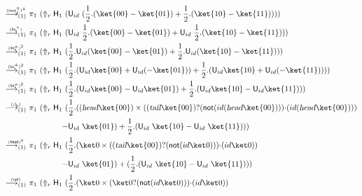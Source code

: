 \documentclass[preprint]{elsarticle}
\newcommand\lra[1][1]{\longrightarrow_{\left(#1\right)}}
\newcommand\ite[3]{{#1}?{#2}\mathord{\cdot}{#3}}
\newcommand\pair[2]{({#1}+{#2})}
\newcommand\npair[2]{({#1}-{#2})}
\newcommand\s[1]{\ensuremath{\mathsf{#1}}}
\newcommand\head{\text{\sl head}}
\newcommand\tail{\text{\sl tail}}
\newcommand\red[2][1]{\overset{\scriptscriptstyle\smash{#2}\vphantom{x}}{\lra[#1]}\ }
\newcommand\rbetab{(\s{\beta_b})}
\newcommand\rlinr{(\s{lin^+_r})}
\newcommand\rlinscalr{(\s{lin^\alpha_r})}
\newcommand\rcaneutl{(\s{neut^\Uparrow_\ell})}
\newcommand\rhead{(\s{head})}
\newcommand\rtail{(\s{tail})}
\begin{document}
\begin{align*}
  \red{\rcaneutl^4}&
                     \pi_1\ (\Uparrow_r \s H_1\ (\s U_{id}\
                     \pair { \frac 12.  \npair{\ket{00}}{\ket{01}} }
                     { \frac 12.  \npair{\ket{10}}{\ket{11}} })) \\
  \red{\rlinr}&
                \pi_1\ (\Uparrow_r \s H_1\
                \pair{\s U_{id}\ \frac 12.\npair{\ket{00}}{\ket{01}}}{\s U_{id}\ \frac 12.\npair{\ket{10}}{\ket{11}}}) \\
  \red{\rlinscalr^2}&
                      \pi_1\ (\Uparrow_r \s H_1\
                      \pair{\frac 12.\s U_{id}\npair{\ket{00}}{\ket{01}}}{\frac 12.\s U_{id}\npair{\ket{10}}{\ket{11}}}) \\
  \red{\rlinr^2}&
                  \pi_1\ (\Uparrow_r \s H_1\
                  \pair{\frac 12.\pair{\s U_{id}\ket{00}}{\s U_{id}(-\ket{01})}}{\frac 12.\pair{\s U_{id}\ket{10}}{\s U_{id}(-\ket{11})}}) \\
  \red{\rlinscalr^2}&
                      \pi_1\ (\Uparrow_r \s H_1\
                      \pair{\frac 12.\npair{\s U_{id}\ket{00}}{\s U_{id}\ket{01}}}{\frac 12.\npair{\s U_{id}\ket{10}}{\s U_{id}\ket{11}}}) \\
  \red\rbetab&
               \begin{aligned}[t]
                 \pi_1\ (\Uparrow_r\s H_1\ ( & \frac 12.(
                 (\head\ket{00})\times(\ite{(\tail\ket{00})}{(\s{not}(id(\head\ket{00})))}{(id(\head\ket{00}))})
                 \\
                 -& { \s U_{id}\ \ket{01} }) +{ \frac 12. \npair{ \s U_{id}\
                     \ket{10} }{ \s U_{id}\ \ket{11} } }))
               \end{aligned}
  \\
  \red{\rhead^3}&
                  \begin{aligned}[t]
                    \pi_1\ (\Uparrow_r\s H_1\ (
                    & \frac 12.( \ket 0\times(\ite{(\tail\ket{00})}{(\s{not}(id\ket 0)))}{(id\ket 0)}) \\
                    -& { \s U_{id}\ \ket{01} }) +({ \frac 12. \npair{ \s U_{id}\
                        \ket{10} }{ \s U_{id}\ \ket{11} } }))
                  \end{aligned}
  \\
  \red{\rtail}&
                \begin{aligned}[t]
                  \pi_1\ (\Uparrow_r\s H_1\ ( &
                  \frac 12.( \ket 0\times(\ite{\ket 0}{(\s{not}(id\ket 0)))}{(id\ket 0)}) \\

\end{aligned}
\end{align*}
\end{document}

